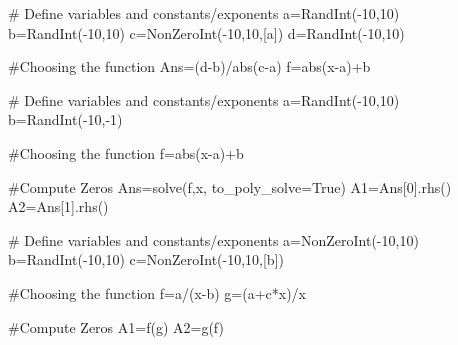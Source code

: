 \begin{sagesilent}
# Define variables and constants/exponents
a=RandInt(-10,10)
b=RandInt(-10,10)
c=NonZeroInt(-10,10,[a])
d=RandInt(-10,10)

#Choosing the function
Ans=(d-b)/abs(c-a)
f=abs(x-a)+b

\end{sagesilent}
 

\begin{sagesilent}
# Define variables and constants/exponents
a=RandInt(-10,10)
b=RandInt(-10,-1)

#Choosing the function
f=abs(x-a)+b

#Compute Zeros
Ans=solve(f,x, to_poly_solve=True)
A1=Ans[0].rhs()
A2=Ans[1].rhs()
\end{sagesilent}
 


\begin{sagesilent}
# Define variables and constants/exponents
a=NonZeroInt(-10,10)
b=RandInt(-10,10)
c=NonZeroInt(-10,10,[b])

#Choosing the function
f=a/(x-b)
g=(a+c*x)/x

#Compute Zeros
A1=f(g)
A2=g(f)
\end{sagesilent}
 
